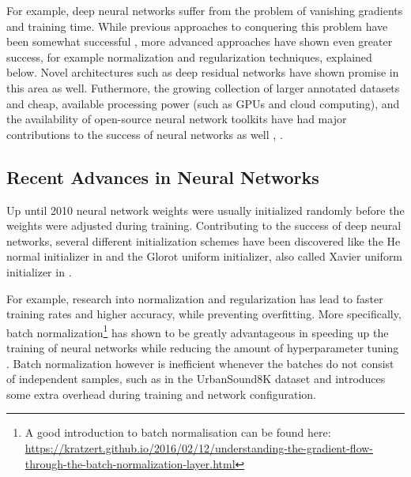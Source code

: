 For example, deep neural networks suffer from the problem of vanishing gradients \cite{Hochreiter:01book} and training time.  While previous approaches to conquering this problem have been somewhat successful \cite{DBLP:journals/corr/abs-1206-5533}, more advanced approaches have shown even greater success, for example normalization and regularization techniques, explained below.  Novel architectures such as deep residual networks \cite{DBLP:journals/corr/HeZRS15} have shown promise in this area as well.  Futhermore, the growing collection of larger annotated datasets and cheap, available processing power (such as GPUs and cloud computing), and the availability of open-source neural network toolkits have had major contributions to the success of neural networks as well \cite{tensorflow2015-whitepaper}, \cite{DBLP:journals/corr/SynnaeveNACLLRU16}. %

\subsection{Recent Advances in Neural Networks}

Up until 2010 neural network weights were usually initialized randomly before the weights were adjusted during training.  Contributing to the success of deep neural networks, several different initialization schemes have been discovered like the He normal initializer in \cite{DBLP:journals/corr/HeZR015} and the Glorot uniform initializer, also called Xavier uniform initializer in \cite{pmlr-v9-glorot10a}.

For example, research into normalization and regularization has lead to faster training rates and higher accuracy, while preventing overfitting.  More specifically, batch normalization\footnote{A good introduction to batch normalisation can be found here: \url{https://kratzert.github.io/2016/02/12/understanding-the-gradient-flow-through-the-batch-normalization-layer.html}} has shown to be greatly advantageous in speeding up the training of neural networks while reducing the amount of hyperparameter tuning \cite{DBLP:journals/corr/IoffeS15}. Batch normalization however is inefficient whenever the batches do not consist of independent samples, such as in the UrbanSound8K dataset and introduces some extra overhead during training and network configuration.


